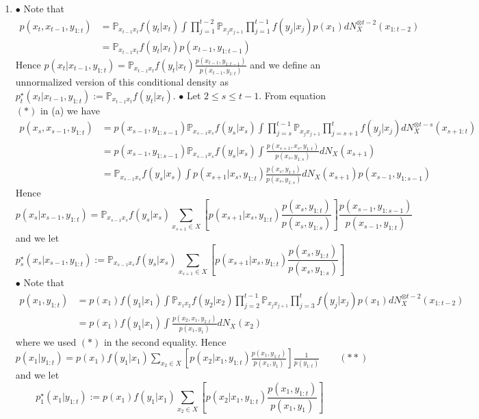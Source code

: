 \documentclass[a4paper,11pt, hidelinks]{article}
\begin{document}
\begin{enumerate}[label=(\alph*)]
	\item 
	$\bullet$ Note that $$\begin{aligned}p(x_t,x_{t-1},y_{1:t}) &= \mathbb P_{x_{t-1} x_t} f(y_t|x_t) \int \prod_{j=1}^{t-2}\mathbb P_{x_{j} x_{j+1}} \prod_{j=1}^{t-1}f(y_j|x_j)p(x_1) dN_X^{\otimes t-2}(x_{1:t-2})\\ &=  \mathbb P_{x_{t-1} x_t} f(y_t|x_t) p(x_{t-1},y_{1:t-1})\end{aligned}$$
	Hence $\displaystyle p(x_t|x_{t-1},y_{1:t}) = \mathbb P_{x_{t-1} x_t} f(y_t|x_t) \frac{p(x_{t-1},y_{1:t-1})}{p(x_{t-1},y_{1:t})}$ and we define an unnormalized version of this conditional density as $p_t^\star(x_t|x_{t-1},y_{1:t}) := \mathbb P_{x_{t-1} x_t} f(y_t|x_t)$.
	\newline
	\newline
	$\bullet$ Let $2\leq s \leq t-1$. From equation $(*)$ in (a) we have 
	$$\begin{aligned} p(x_s,x_{s-1},y_{1:t}) &= p(x_{s-1},y_{1:s-1})\mathbb P_{x_{s-1} x_s} f(y_s|x_s)\int \prod_{j=s}^{t-1}\mathbb P_{x_{j} x_{j+1}} \prod_{j=s+1}^{t}f(y_j|x_j)dN_X^{\otimes t-s}(x_{s+1:t}) \\
	&= p(x_{s-1},y_{1:s-1})\mathbb P_{x_{s-1} x_s} f(y_s|x_s) \int \frac{p(x_{s+1},x_{s},y_{1:t})}{p(x_{s},y_{1:s})} dN_X(x_{s+1})\\
	&= \mathbb P_{x_{s-1} x_s} f(y_s|x_s) \int p(x_{s+1}|x_{s},y_{1:t}) \frac{p(x_{s},y_{1:t})}{p(x_{s},y_{1:s})} dN_X(x_{s+1}) p(x_{s-1},y_{1:s-1})
	\end{aligned}$$
	Hence $$p(x_s|x_{s-1},y_{1:t}) = \mathbb P_{x_{s-1} x_s} f(y_s|x_s) \sum_{x_{s+1}\in X} \left[p(x_{s+1}|x_{s},y_{1:t}) \frac{p(x_{s},y_{1:t})}{p(x_{s},y_{1:s})}\right]  \frac{p(x_{s-1},y_{1:s-1})}{p(x_{s-1},y_{1:t})}$$
	and we let $$p_s^\star(x_s|x_{s-1},y_{1:t}) := \mathbb P_{x_{s-1} x_s} f(y_s|x_s) \sum_{x_{s+1}\in X} \left[p(x_{s+1}|x_{s},y_{1:t}) \frac{p(x_{s},y_{1:t})}{p(x_{s},y_{1:s})}\right]$$
	\newline
	$\bullet$ Note that $$\begin{aligned}
		p(x_1,y_{1:t}) &= p(x_1) f(y_1|x_1) \int \mathbb P_{x_{1} x_{2}} f(y_2|x_2) \prod_{j=2}^{t-1}\mathbb P_{x_{j} x_{j+1}} \prod_{j=3}^{t}f(y_j|x_j)p(x_1) dN_X^{\otimes t-2}(x_{1:t-2})\\
		&= p(x_1) f(y_1|x_1) \int \frac{p(x_2,x_1,y_{1:t})}{p(x_1,y_1)} dN_X(x_2)
	\end{aligned}$$
	where we used $(*)$ in the second equality.\newline
	Hence $\displaystyle p(x_1|y_{1:t}) = p(x_1) f(y_1|x_1) \sum_{x_2\in X} \left[p(x_2|x_1,y_{1:t}) \frac{p(x_1,y_{1:t})}{p(x_1,y_1)}\right] \frac{1}{p(y_{1:t})} \quad \quad (**) \quad $ and we let $$p_1^\star(x_1|y_{1:t}) := p(x_1) f(y_1|x_1) \sum_{x_2\in X} \left[p(x_2|x_1,y_{1:t}) \frac{p(x_1,y_{1:t})}{p(x_1,y_1)}\right]$$
	

\end{enumerate}
\end{document}
